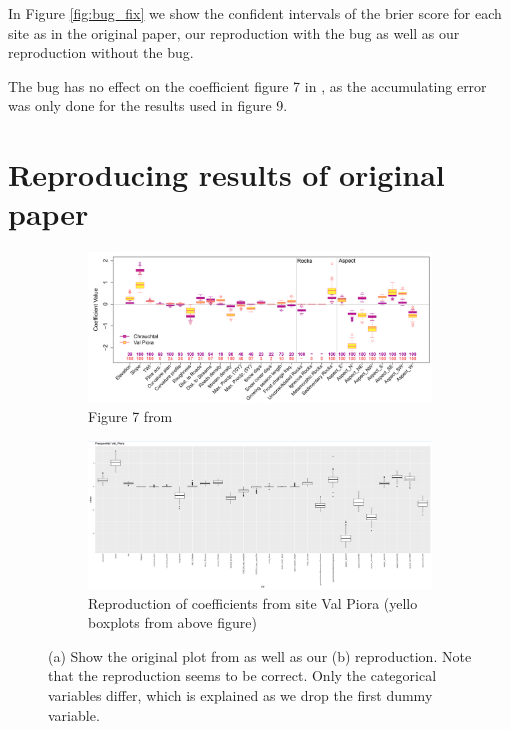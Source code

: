 \documentclass[twoside,twocolumn]{article}
\begin{document}
In Figure \ref{fig:bug_fix} we show the confident intervals of the brier score for each site as in the original paper, our reproduction with the bug as well as our reproduction without the bug.

The bug has no effect on the coefficient figure 7 in \cite{zweifel_samarin_meusburger_alewell_2021}, as the accumulating error was only done for the results used in figure 9.

\section{Reproducing results of original paper} \label{sec:reproduction}

\begin{figure}

    \centering

    \begin{subfigure}[b]{\textwidth}
       \includegraphics[width=1\textwidth]{orig_coef}
       \caption{Figure 7 from \cite{zweifel_samarin_meusburger_alewell_2021}}
       \label{fig:Ng1}
    \end{subfigure}

    \begin{subfigure}[b]{\textwidth}
       \includegraphics[width=1\textwidth]{rep_coef}
       \caption{Reproduction of coefficients from site Val Piora (yello boxplots from above figure)}
       \label{fig:Ng2}
    \end{subfigure}

    \caption[Two numerical solutions]{(a) Show the original plot from \cite{zweifel_samarin_meusburger_alewell_2021} as well as our (b) reproduction. Note that the reproduction seems to be correct. Only the categorical variables differ, which is explained as we drop the first dummy variable.}
    \label{fig:reproduction}
\end{figure}
\end{document}

